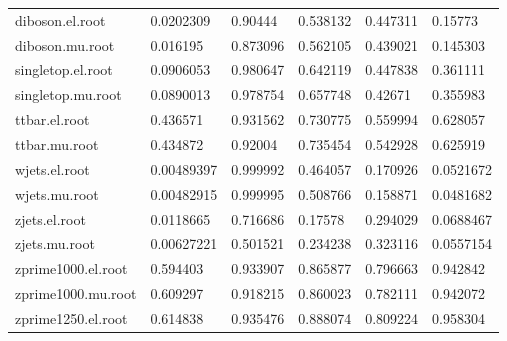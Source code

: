 \begin{table}[H]
\begin{tabular}{l|lllll}
    diboson.el.root    & 0.0202309  & 0.90444  & 0.538132 & 0.447311 & 0.15773   \\
    diboson.mu.root    & 0.016195   & 0.873096 & 0.562105 & 0.439021 & 0.145303  \\
    singletop.el.root  & 0.0906053  & 0.980647 & 0.642119 & 0.447838 & 0.361111  \\
    singletop.mu.root  & 0.0890013  & 0.978754 & 0.657748 & 0.42671  & 0.355983  \\
    ttbar.el.root      & 0.436571   & 0.931562 & 0.730775 & 0.559994 & 0.628057  \\
    ttbar.mu.root      & 0.434872   & 0.92004  & 0.735454 & 0.542928 & 0.625919  \\
    wjets.el.root      & 0.00489397 & 0.999992 & 0.464057 & 0.170926 & 0.0521672 \\
    wjets.mu.root      & 0.00482915 & 0.999995 & 0.508766 & 0.158871 & 0.0481682 \\
    zjets.el.root      & 0.0118665  & 0.716686 & 0.17578  & 0.294029 & 0.0688467 \\
    zjets.mu.root      & 0.00627221 & 0.501521 & 0.234238 & 0.323116 & 0.0557154 \\
    zprime1000.el.root & 0.594403   & 0.933907 & 0.865877 & 0.796663 & 0.942842  \\
    zprime1000.mu.root & 0.609297   & 0.918215 & 0.860023 & 0.782111 & 0.942072  \\
    zprime1250.el.root & 0.614838   & 0.935476 & 0.888074 & 0.809224 & 0.958304  \\

\end{tabular}
\end{table}
